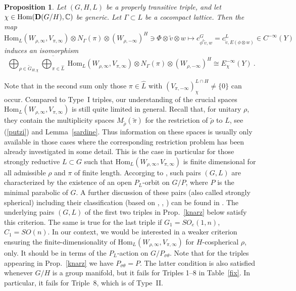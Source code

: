 \documentclass[10]{amsart}
\newtheorem{pro}[thm]{Proposition}
\theoremstyle{remark}
\theoremstyle{definition}
\numberwithin{equation}{section}
\newcommand{\C}{\mathbb{C}}           %
\newcommand{\Hom}{\mathrm{Hom}}
\begin{document}
{\begin{pro}\label{monika}
Let $(G,H,L)$ be a properly transitive triple, and let $\chi\in\Hom({\bf D}(G/H),\C)$ be generic.  Let $\Gamma\subset L$ be a cocompact lattice. Then the map
$$  \Hom_L(W_{\rho,\infty},V_{\pi,\infty})\otimes N_\Gamma(\pi)\otimes (W_{\rho,-\infty})^H\ni \Phi\otimes\tilde v\otimes w \mapsto 
c^G_{\phi^t\tilde v,w}=c^L_{\tilde v, E(\phi\otimes w)}\in C^{-\infty}(Y) $$
induces an isomorphism
$$ \bigoplus_{\rho\in \widetilde G_{H,\chi}}\overline{\bigoplus_{\pi\in\widehat L}}\:  \Hom_L(W_{\rho,\infty},V_{\pi,\infty})\otimes N_\Gamma(\pi)\otimes (W_{\rho,-\infty})^H
\cong E_\chi^{-\infty}(Y)\ .$$
\end{pro}
Note that in the second sum only those $\pi\in\widehat L$ with $(V_{\pi,-\infty})^{L\cap H}_\chi\ne\{0\}$ can occur. Compared to Type~I triples, our understanding of the crucial 
spaces $\Hom_L(W_{\rho,\infty},V_{\pi,\infty})$ is still quite limited in general. Recall that, for unitary $\rho$, they contain the multiplicity spaces $M_{\tilde\rho}(\tilde\pi)$ for
the restriction of $\tilde\rho$ to $L$, see (\ref{putzi}) and Lemma~\ref{sardine}. Thus information on these spaces is usually only available in those cases where the corresponding restriction problem has been already investigated in some detail. This is the case in particular for those strongly reductive $L\subset G$ such that $\Hom_L(W_{\rho,\infty},V_{\pi,\infty})$ is finite dimensional for all admissible $\rho$ and $\pi$ of finite length. Accorging to \cite{KO13}, such pairs $(G,L)$ are characterized by the existence of an open $P_L$-orbit on $G/P$, where $P$ is the minimal parabolic of $G$. A further discussion of these pairs (also called strongly spherical) including their classification (based on \cite{KM14}, \cite{KKPS}, \cite{KKPSII}) can be found in \cite{Mol17}. 
The underlying pairs $(G,L)$ of the first two triples in Prop.~\ref{knarz} below satisfy this criterion. The same is true for the last triple if $G_1=SO_e(1,n)$, $C_1=SO(n)$.
In our context, we would be interested in a weaker criterion ensuring the finite-dimensionality of $\Hom_L(W_{\rho,\infty},V_{\pi,\infty})$ for $H$-cospherical $\rho$, only.
It should be in terms of the $P_L$-action on $G/P_{\sigma\theta}$. Note that for the triples appearing in  Prop.~\ref{knarz} we have $P_{\sigma\theta}=P$.
The latter condition is also satisfied whenever $G/H$ is a group manifold, but it fails for Triples 1--8 in Table~\ref{fix}. In particular, it fails
for Triple~8, which is of Type~II.


}
\end{document}
